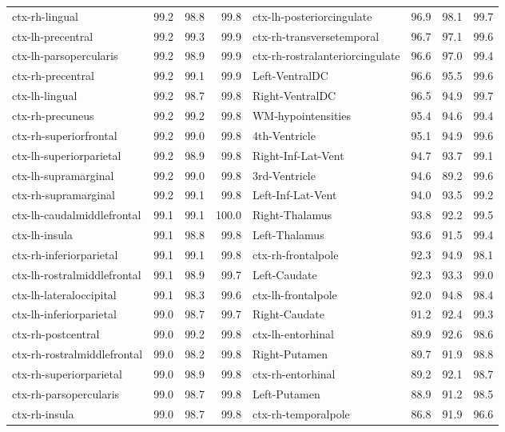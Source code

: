 \begin{tabular}{lrrrlrrr}
ctx-rh-lingual & 99.2 & 98.8 & 99.8 & ctx-lh-posteriorcingulate & 96.9 & 98.1 & 99.7 \\
ctx-lh-precentral & 99.2 & 99.3 & 99.9 & ctx-rh-transversetemporal & 96.7 & 97.1 & 99.6 \\
ctx-lh-parsopercularis & 99.2 & 98.9 & 99.9 & ctx-rh-rostralanteriorcingulate & 96.6 & 97.0 & 99.4 \\
ctx-rh-precentral & 99.2 & 99.1 & 99.9 & Left-VentralDC & 96.6 & 95.5 & 99.6 \\
ctx-lh-lingual & 99.2 & 98.7 & 99.8 & Right-VentralDC & 96.5 & 94.9 & 99.7 \\
ctx-rh-precuneus & 99.2 & 99.2 & 99.8 & WM-hypointensities & 95.4 & 94.6 & 99.4 \\
ctx-rh-superiorfrontal & 99.2 & 99.0 & 99.8 & 4th-Ventricle & 95.1 & 94.9 & 99.6 \\
ctx-lh-superiorparietal & 99.2 & 98.9 & 99.8 & Right-Inf-Lat-Vent & 94.7 & 93.7 & 99.1 \\
ctx-lh-supramarginal & 99.2 & 99.0 & 99.8 & 3rd-Ventricle & 94.6 & 89.2 & 99.6 \\
ctx-rh-supramarginal & 99.2 & 99.1 & 99.8 & Left-Inf-Lat-Vent & 94.0 & 93.5 & 99.2 \\
ctx-lh-caudalmiddlefrontal & 99.1 & 99.1 & 100.0 & Right-Thalamus & 93.8 & 92.2 & 99.5 \\
ctx-lh-insula & 99.1 & 98.8 & 99.8 & Left-Thalamus & 93.6 & 91.5 & 99.4 \\
ctx-rh-inferiorparietal & 99.1 & 99.1 & 99.8 & ctx-rh-frontalpole & 92.3 & 94.9 & 98.1 \\
ctx-lh-rostralmiddlefrontal & 99.1 & 98.9 & 99.7 & Left-Caudate & 92.3 & 93.3 & 99.0 \\
ctx-lh-lateraloccipital & 99.1 & 98.3 & 99.6 & ctx-lh-frontalpole & 92.0 & 94.8 & 98.4 \\
ctx-lh-inferiorparietal & 99.0 & 98.7 & 99.7 & Right-Caudate & 91.2 & 92.4 & 99.3 \\
ctx-rh-postcentral & 99.0 & 99.2 & 99.8 & ctx-lh-entorhinal & 89.9 & 92.6 & 98.6 \\
ctx-rh-rostralmiddlefrontal & 99.0 & 98.2 & 99.8 & Right-Putamen & 89.7 & 91.9 & 98.8 \\
ctx-rh-superiorparietal & 99.0 & 98.9 & 99.8 & ctx-rh-entorhinal & 89.2 & 92.1 & 98.7 \\
ctx-rh-parsopercularis & 99.0 & 98.7 & 99.8 & Left-Putamen & 88.9 & 91.2 & 98.5 \\
ctx-rh-insula & 99.0 & 98.7 & 99.8 & ctx-rh-temporalpole & 86.8 & 91.9 & 96.6 \\

\end{tabular}
